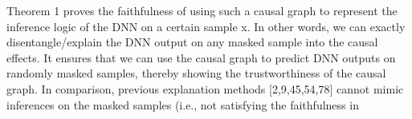 Theorem 1 proves the faithfulness of using such a causal
graph to represent the inference logic of the DNN on a certain
sample x. In other words, we can exactly disentangle/explain
the DNN output on any masked sample into the causal effects.
It ensures that we can use the causal graph to predict DNN
outputs on randomly masked samples, thereby showing the
trustworthiness of the causal graph. In comparison, previous
explanation methods [2,9,45,54,78] cannot mimic inferences
on the masked samples (i.e., not satisfying the faithfulness in

